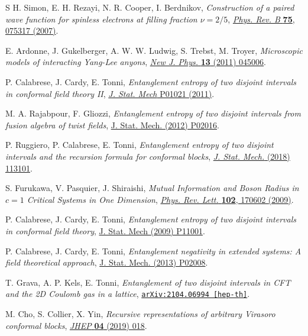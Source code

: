 \documentclass[a4paper,11pt]{article}
\begin{document}
\begin{thebibliography}{99}
 S H. Simon, E. H. Rezayi, N. R. Cooper, I. Berdnikov, \emph{Construction of a paired wave function for spinless electrons at filling fraction $\nu=2/5$}, \href{https://doi.org/10.1103/PhysRevB.75.075317}{\emph{Phys. Rev. B} {\bf 75}, 075317 (2007)}.

 E. Ardonne, J. Gukelberger, A. W. W. Ludwig, S. Trebst, M. Troyer, \emph{Microscopic models of interacting Yang-Lee anyons},
\href{https://doi.org/10.1088/1367-2630/13/4/045006}{\emph{New J. Phys.} {\bf 13} (2011) 045006}.

 P. Calabrese, J. Cardy, E. Tonni, \emph{Entanglement entropy of two disjoint intervals in conformal field theory II}, \href{https://doi.org/10.1088/1742-5468/2011/01/P01021}{\emph{J. Stat. Mech} P01021 (2011)}.

 M. A. Rajabpour, F. Gliozzi, \emph{Entanglement entropy of two disjoint intervals from fusion algebra of twist fields},
\href{https://doi.org/10.1088/1742-5468/2012/02/P02016}{J. Stat. Mech. (2012) P02016}.

 P. Ruggiero, P. Calabrese, E. Tonni, \emph{Entanglement entropy of two disjoint intervals and the recursion formula
for conformal blocks}, \href{https://doi.org/10.1088/1742-5468/aae5a8}{\emph{J. Stat. Mech.} (2018) 113101}.

  S. Furukawa, V. Pasquier, J. Shiraishi, \emph{Mutual Information and Boson Radius in $c=1$ Critical Systems in One Dimension}, \href{https://doi.org/10.1103/PhysRevLett.102.170602}{\emph{Phys. Rev. Lett.} {\bf 102}, 170602 (2009)}.

 P. Calabrese, J. Cardy, E. Tonni, \emph{Entanglement entropy of two disjoint intervals in conformal field theory},
\href{https://doi.org/10.1088/1742-5468/2009/11/P11001}{J. Stat. Mech (2009) P11001}.

 P. Calabrese, J. Cardy, E. Tonni, \emph{Entanglement negativity in extended systems:  A field theoretical approach},
\href{https://doi.org/10.1088/1742-5468/2013/02/P02008}{J. Stat. Mech. (2013) P02008}.

 T. Grava, A. P. Kels, E. Tonni, \emph{Entanglement of two disjoint intervals in CFT and the 2D Coulomb gas in a lattice},
\href{https://arxiv.org/abs/2104.06994}{\texttt{arXiv:2104.06994 [hep-th]}}.

 M. Cho, S. Collier, X. Yin, \emph{Recursive representations of arbitrary Virasoro conformal blocks}, 
\href{https://doi.org/10.1007/JHEP04(2019)018}{\emph{JHEP} {\bf 04} (2019) 018}.


\end{thebibliography}
\end{document}
